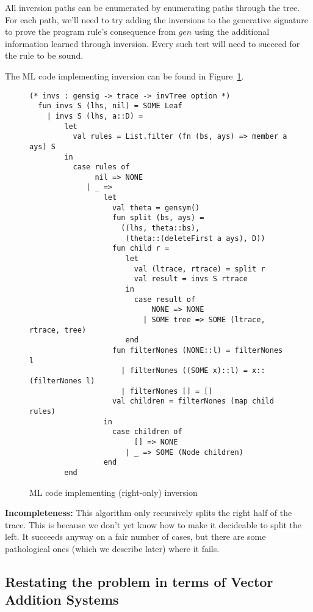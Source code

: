 \documentclass[fullpage, 11pt]{article}
\begin{document}
All inversion paths can be enumerated by enumerating paths through the
tree. For each path, we'll need to try adding the inversions to the
generative signature to prove the program rule's consequence from $gen$
using the additional information learned through inversion. Every such test
will need to succeed for the rule to be sound.

The ML code implementing inversion can be found in
Figure~\ref{fig:inversion}.

\begin{figure}[ht]
\label{fig:inversion}
\footnotesize
\begin{verbatim}
(* invs : gensig -> trace -> invTree option *)
  fun invs S (lhs, nil) = SOME Leaf
    | invs S (lhs, a::D) =
        let 
          val rules = List.filter (fn (bs, ays) => member a ays) S
        in  
          case rules of
               nil => NONE
             | _ =>
                 let 
                   val theta = gensym()
                   fun split (bs, ays) = 
                     ((lhs, theta::bs), 
                      (theta::(deleteFirst a ays), D)) 
                   fun child r = 
                      let 
                        val (ltrace, rtrace) = split r
                        val result = invs S rtrace
                      in  
                        case result of
                            NONE => NONE
                          | SOME tree => SOME (ltrace, rtrace, tree)
                      end 
                   fun filterNones (NONE::l) = filterNones l
                     | filterNones ((SOME x)::l) = x::(filterNones l)
                     | filterNones [] = []
                   val children = filterNones (map child rules)
                 in  
                   case children of
                        [] => NONE
                      | _ => SOME (Node children)
                 end 
        end 
\end{verbatim}
\caption{ML code implementing (right-only) inversion}
\end{figure}

{\bf Incompleteness:}
This algorithm only recursively splits the right half
of the trace. This is because we don't yet know how to make it decideable
to split the left. It succeeds anyway on a fair number of cases, but there
are some pathological ones (which we describe later) where it fails.


\subsection{Restating the problem in terms of Vector Addition Systems}
\end{document}
